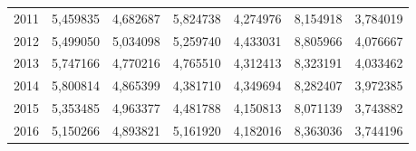 \begin{table}
\begin{tabular}{p{1cm}p{2cm}p{2cm}p{2cm}p{2cm}p{2cm}p{2cm}}
 2011 &                 5,459835 &                                     4,682687 &     5,824738 &                               4,274976 & 8,154918 &           3,784019 \\
 2012 &                 5,499050 &                                     5,034098 &     5,259740 &                               4,433031 & 8,805966 &           4,076667 \\
 2013 &                 5,747166 &                                     4,770216 &     4,765510 &                               4,312413 & 8,323191 &           4,033462 \\
 2014 &                 5,800814 &                                     4,865399 &     4,381710 &                               4,349694 & 8,282407 &           3,972385 \\
 2015 &                 5,353485 &                                     4,963377 &     4,481788 &                               4,150813 & 8,071139 &           3,743882 \\
 2016 &                 5,150266 &                                     4,893821 &     5,161920 &                               4,182016 & 8,363036 &           3,744196 \\
\bottomrule
\end{tabular}
\end{table}
